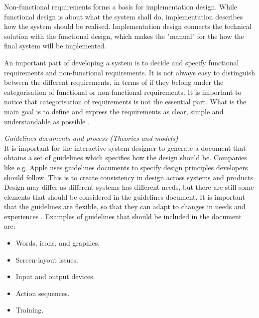 Non-functional requirements forms a basis for implementation design. While functional design is about what the system shall do, implementation describes how the system should be realised. Implementation design connects the technical solution with the functional design, which makes the "manual" for the how the final system will be implemented.  

An important part of developing a system is to decide and specify functional requirements and non-functional requirements. It is not always easy to distinguish between the different requirements, in terms of if they belong under the categorisation of functional or non-functional requirements. It is important to notice that categorisation of requirements is not the essential part. What is the main goal is to define and express the requirements as clear, simple and understandable as possible \cite{systemutviklingDel1}.  

\emph{Guidelines documents and process (Theories and models)}\\
It is important for the interactive system designer to generate a document that obtains a set of guidelines which specifies how the design should be. Companies like e.g. Apple uses guidelines documents to specify design principles developers should follow. This is to create consistency in design across systems and products. Design may differ as different systems has different needs, but there are still some elements that should be considered in the guidelines document. It is important that the guidelines are flexible, so that they can adapt to changes in needs and experiences \cite{mmi}. Examples of guidelines that should be included in the document are:

\begin{itemize}
\renewcommand{\labelitemi}{$\bullet$}
\item Words, icons, and graphics.
\item Screen-layout issues.
\item Input and output devices.
\item Action sequences.
\item Training.
\end{itemize}

